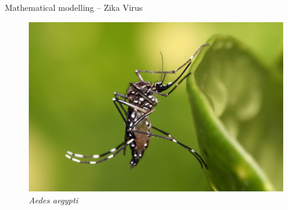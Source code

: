 \documentclass[table,notes]{beamer}\usepackage[]{graphicx}\usepackage[]{color}
\begin{document}
\begin{frame}[fragile]{Mathematical modelling -- Zika Virus}
\begin{minipage}{.6\textwidth}
\end{minipage} \hfill
\begin{minipage} {.37\textwidth}
\begin{figure}
  \caption{\textit{Aedes aegypti}}
  \centering
  \includegraphics[width=\textwidth,keepaspectratio]{Aedes_aegypti.jpg}
\end{figure}
\end{minipage}


\end{frame}
\end{document}
